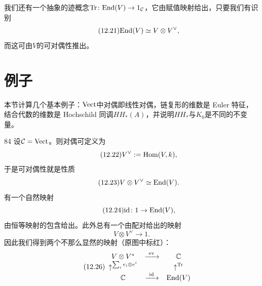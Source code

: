 我们还有一个抽象的迹概念$\operatorname{Tr}\colon\mathrm{End}(V)\to 1_{\mathcal{C}}$，它由赋值映射给出，只要我们有识别
\begin{equation}\tag{12.21}
\mathrm{End}(V)\simeq V\otimes V^{\vee},
\end{equation}
而这可由$V$的可对偶性推出。


\section{例子}\label{sec:12-3}

\begin{sectionkey}
本节计算几个基本例子：$\mathrm{Vect}$中对偶即线性对偶，链复形的维数是 Euler 特征，结合代数的维数是 Hochschild 同调$HH_*(A)$，并说明$HH_*$与$K_0$是不同的不变量。
\end{sectionkey}

\begin{srcex}{84}
设$\mathcal{C}=\mathrm{Vect}$。则对偶可定义为
\begin{equation}\tag{12.22}
V^{\vee}:=\mathrm{Hom}(V,k),
\end{equation}
于是可对偶性就是性质
\begin{equation}\tag{12.23}
V\otimes V^{\vee}\simeq\mathrm{End}(V).
\end{equation}
有一个自然映射
\begin{equation}\tag{12.24}
\mathrm{id}\colon 1\to\mathrm{End}(V),
\end{equation}
由恒等映射的包含给出。此外总有一个由配对给出的映射
\begin{equation}\tag{12.25}
V\otimes V^{\vee}\to 1.
\end{equation}
因此我们得到两个不那么显然的映射（原图中标红）：
\begin{equation}\tag{12.26}
\begin{array}{ccc}
V\otimes V^{*} & \xrightarrow{\ \mathrm{ev}\ } & \mathbb{C}\\
{\uparrow}^{\sum_i e_i\otimes e^i} & & {\uparrow}^{\operatorname{Tr}}\\
\mathbb{C} & \xrightarrow{\ \mathrm{id}\ } & \mathrm{End}(V)
\end{array}
\end{equation}
\end{srcex}


